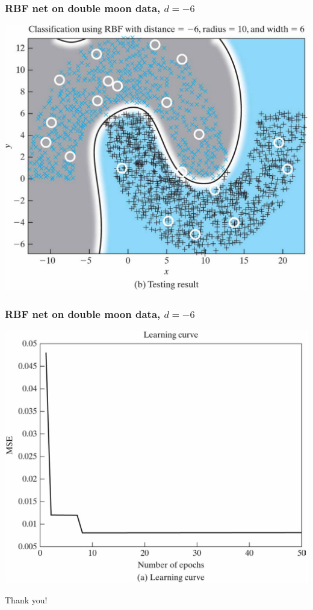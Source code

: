 \documentclass[12pt,notes,mathserif]{beamer}
\newcommand{\chuhao}{\fontsize{44.9pt}{\baselineskip}\selectfont}
\begin{document}
\begin{frame}
	\frametitle{RBF net on double moon data, $d=-6$}
	\begin{center}
		\includegraphics[width=0.8\linewidth]{fig/lec741.jpg}
	\end{center}
\end{frame}

\begin{frame}
	\frametitle{RBF net on double moon data, $d=-6$}
	\begin{center}
		\includegraphics[width=0.8\linewidth]{fig/lec742.jpg}
	\end{center}
\end{frame}






\begin{frame}
	\begin{center}
		\chuhao Thank you! %
	\end{center}
\end{frame}
\end{document}
